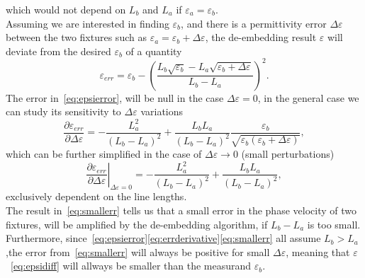 \documentclass[11pt,a4paper]{article}
\begin{document}
    which would not depend on $L_b$ and $L_a$ if $\varepsilon_a = \varepsilon_b$.\\
    Assuming we are interested in finding $\varepsilon_b$, and there is a permittivity error $\Delta\varepsilon$ between
    the two fixtures such as $\varepsilon_a = \varepsilon_b+\Delta\varepsilon$, the de-embedding result $\varepsilon$
    will deviate from the desired $\varepsilon_b$ of a quantity
    \begin{equation}
        \varepsilon_{err} = \varepsilon_b -
        \left(\dfrac{L_b \sqrt{\varepsilon_b} - L_a \sqrt{\varepsilon_b+\Delta\varepsilon}}{L_b - L_a}\right)^2.
        \label{eq:epsierror}
    \end{equation}
    The error in~\eqref{eq:epsierror}, will be null in the case $\Delta\varepsilon = 0$, in the general case we can
    study its sensitivity to $\Delta\varepsilon$ variations
    \begin{equation}
        \dfrac{\partial \varepsilon_{err}}{\partial \Delta\varepsilon} =
        - \dfrac{L_a^2}{(L_b - L_a)^2} +
        \dfrac{L_b L_a}{(L_b - L_a)^2} \dfrac{\varepsilon_b}{\sqrt{\varepsilon_b(\varepsilon_b + \Delta\varepsilon)}},
        \label{eq:errderivative}
    \end{equation}
    which can be further simplified in the case of $\Delta\varepsilon \rightarrow 0$ (small perturbations)
    \begin{equation}
        \left.\dfrac{\partial \varepsilon_{err}}{\partial \Delta\varepsilon}\right|_{\Delta\varepsilon = 0}=
        - \dfrac{L_a^2}{(L_b - L_a)^2} +
        \dfrac{L_b L_a}{(L_b - L_a)^2},
        \label{eq:smallerr}
    \end{equation}
    exclusively dependent on the line lengths. \\
    The result in~\eqref{eq:smallerr} tells us that a small error in the phase velocity of two fixtures, will be
    amplified by the de-embedding algorithm, if $L_b - L_a$ is too small.
    Furthermore, since~\eqref{eq:epsierror}\eqref{eq:errderivative}\eqref{eq:smallerr} all assume $L_b > L_a$,the error
    from~\eqref{eq:smallerr} will always be positive for small $\Delta\varepsilon$, meaning that $\varepsilon$~\eqref{eq:epsidiff}
    will allways be smaller than the measurand $\varepsilon_b$.
\end{document}
